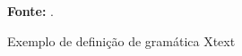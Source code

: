 \begin{figure}[ht!]
\centering

\caption{\textmd{Exemplo de definição de gramática Xtext}}
\label{fig:xtextgramatica}

\par\medskip\textbf{Fonte:} . \par\medskip
\end{figure}
